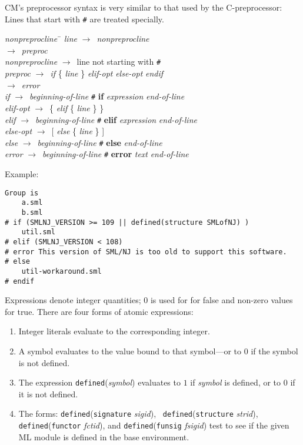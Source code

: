 \documentclass{article}
\newcommand{\nt}[1]{{\it #1}}
\newcommand{\tl}[1]{{\bf #1}}
\newcommand{\ar}{$\rightarrow$\ }
\begin{document}
CM's preprocessor syntax is very similar to that used by the
C-preprocessor: Lines that start with \verb|#| are treated specially.

\begin{tabbing}
\nt{nonpreprocline}~\=\kill
\nt{line} \> \ar \nt{nonpreprocline} \\
 \> \ar \nt{preproc} \\
\nt{nonpreprocline} \> \ar line not starting with \verb+#+ \\
\nt{preproc} \> \ar \nt{if} \{ \nt{line} \} \nt{elif-opt} \nt{else-opt} \nt{endif} \\
 \> \ar \nt{error} \\
\nt{if} \> \ar \nt{beginning-of-line} \verb|#| \tl{if} \nt{expression} \nt{end-of-line} \\
\nt{elif-opt} \> \ar \{ \nt{elif} \{ \nt{line} \} \} \\
\nt{elif} \> \ar \nt{beginning-of-line} \verb|#| \tl{elif} \nt{expression} \nt{end-of-line} \\
\nt{else-opt} \> \ar [ \nt{else} \{ \nt{line} \} ] \\
\nt{else} \> \ar \nt{beginning-of-line} \verb|#| \tl{else} \nt{end-of-line} \\
\nt{error} \> \ar \nt{beginning-of-line} \verb|#| \tl{error}
  \nt{text} \nt{end-of-line}
\end{tabbing}

Example:
\begin{verbatim}
Group is
	a.sml
	b.sml
# if (SMLNJ_VERSION >= 109 || defined(structure SMLofNJ) )
	util.sml
# elif (SMLNJ_VERSION < 108)
# error This version of SML/NJ is too old to support this software.
# else
	util-workaround.sml
# endif
\end{verbatim}

Expressions denote integer quantities; $0$ is used for for false and
non-zero values for true.
There are four forms of atomic expressions:
\begin{enumerate}
\item Integer literals evaluate to the corresponding integer.
\item A symbol evaluates to the value bound to that symbol---or to $0$
if the symbol is not defined.
\item The expression {\tt defined}({\it symbol})
evaluates to $1$ if {\it symbol} is defined, or to $0$ if it is not
defined.
\item The forms: {\tt defined}({\tt signature} {\it sigid}), {\tt
defined}({\tt structure} {\it strid}), {\tt defined}({\tt functor}
{\it fctid}), and {\tt defined}({\tt funsig} {\it fsigid})
test to see if the given ML module is defined in the base environment.
\end{enumerate}
\end{document}

